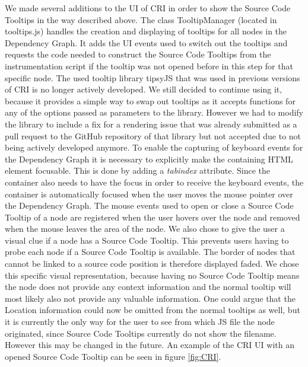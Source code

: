 We made several additions to the UI of CRI in order to show the Source Code Tooltips in the way described above. The class TooltipManager (located in tooltips.js) handles the creation and displaying of tooltips for all nodes in the Dependency Graph. It adds the UI events used to switch out the tooltips and requests the code needed to construct the Source Code Tooltips from the instrumentation script if the tooltip was not opened before in this step for that specific node. The used tooltip library tipsyJS \cite{Tipsy} that was used in previous versions of CRI is no longer actively developed. We still decided to continue using it, because it provides a simple way to swap out tooltips as it accepts functions for any of the options passed as parameters to the library. However we had to modify the library to include a fix for a rendering issue that was already submitted as a pull request to the GitHub repository of that library but not accepted due to not being actively developed anymore. To enable the capturing of keyboard events for the Dependency Graph it is necessary to explicitly make the containing HTML element focusable. This is done by adding a \emph{tabindex} attribute. Since the container also needs to have the focus in order to receive the keyboard events, the container is automatically focused when the user moves the mouse pointer over the Dependency Graph. The mouse events used to open or close a Source Code Tooltip of a node are registered when the user hovers over the node and removed when the mouse leaves the area of the node. We also chose to give the user a visual clue if a node has a Source Code Tooltip. This prevents users having to probe each node if a Source Code Tooltip is available. The border of nodes that cannot be linked to a source code position is therefore displayed faded. We chose this specific visual representation, because having no Source Code Tooltip means the node does not provide any context information and the normal tooltip will most likely also not provide any valuable information. One could argue that the Location information could now be omitted from the normal tooltips as well, but it is currently the only way for the user to see from which JS file the node originated, since Source Code Tooltips currently do not show the filename. However this may be changed in the future. An example of the CRI UI with an opened Source Code Tooltip can be seen in figure \ref{fig:CRI}.
	
